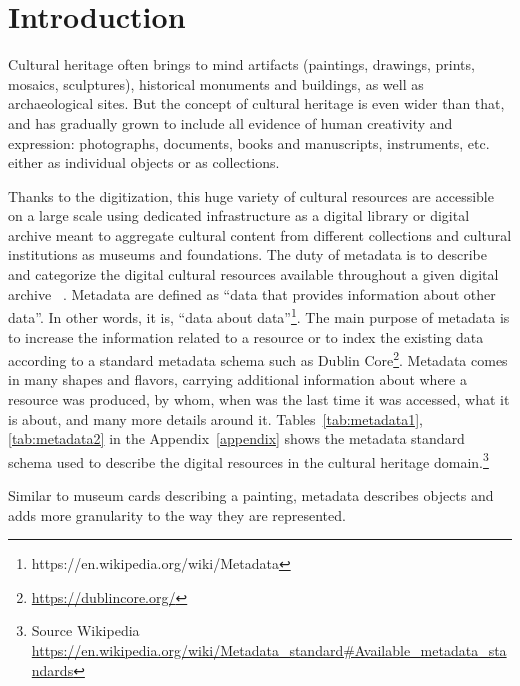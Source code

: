 \documentclass[epsfig,a4paper,12pt,titlepage]{book}
\begin{document}
\chapter{Introduction}
\label{cha:intro}
\chaptermark{}
Cultural heritage often brings to mind artifacts (paintings, drawings, prints, mosaics, sculptures), historical monuments and buildings, as well as archaeological sites. But the concept of cultural heritage is even wider than that, and has gradually grown to include all evidence of human creativity and expression: photographs, documents, books and manuscripts, instruments, etc. either as individual objects or as collections.   

Thanks to the digitization, this huge variety of cultural resources are accessible on a large scale using dedicated infrastructure as a digital library or digital archive meant to aggregate cultural content from different collections and cultural institutions as museums and foundations. The duty of metadata is to describe and categorize the digital cultural resources available throughout a given digital archive 
~\cite{26,27}.  
Metadata are defined as ``data that provides information about other data''. In other words, it is, ``data about data''\footnote{https://en.wikipedia.org/wiki/Metadata}. The main purpose of metadata is to increase the information related to a resource or to index the existing data according to a standard metadata schema such as Dublin Core\footnote{\url{https://dublincore.org/}}. 
Metadata comes in many shapes and flavors, carrying additional information about where a resource was produced, by whom, when was the last time it was accessed, what it is about, and many more details around it.
Tables~\ref{tab:metadata1},\ref{tab:metadata2}  in the Appendix~\ref{appendix} shows the metadata standard schema used to describe the digital resources in the cultural heritage domain.\footnote{Source Wikipedia \url{https://en.wikipedia.org/wiki/Metadata_standard\#Available_metadata_standards}}

Similar to museum cards describing a painting, metadata describes objects and adds more granularity to the way they are represented. 

\end{document}
